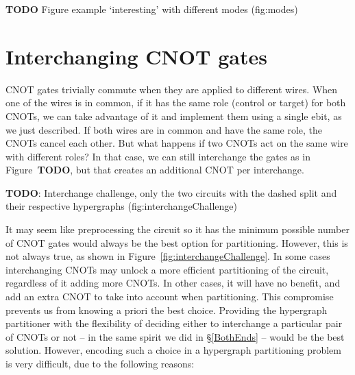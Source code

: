 \textbf{TODO} Figure example `interesting' with different modes (fig:modes)

\section{Interchanging CNOT gates}

CNOT gates trivially commute when they are applied to different wires. When one of the wires is in common, if it has the same role (control or target) for both CNOTs, we can take advantage of it and implement them using a single ebit, as we just described. If both wires are in common and have the same role, the CNOTs cancel each other. But what happens if two CNOTs act on the same wire with different roles? In that case, we can still interchange the gates as in Figure~\textbf{TODO}, but that creates an additional CNOT per interchange.

\textbf{TODO}: Interchange challenge, only the two circuits with the dashed split and their respective hypergraphs (fig:interchangeChallenge)

It may seem like preprocessing the circuit so it has the minimum possible number of CNOT gates would always be the best option for partitioning. However, this is not always true, as shown in Figure~\ref{fig:interchangeChallenge}. In some cases interchanging CNOTs may unlock a more efficient partitioning of the circuit, regardless of it adding more CNOTs. In other cases, it will have no benefit, and add an extra CNOT to take into account when partitioning. This compromise prevents us from knowing a priori the best choice. Providing the hypergraph partitioner with the flexibility of deciding either to interchange a particular pair of CNOTs or not -- in the same spirit we did in \S\ref{BothEnds} -- would be the best solution. However, encoding such a choice in a hypergraph partitioning problem is very difficult, due to the following reasons:

